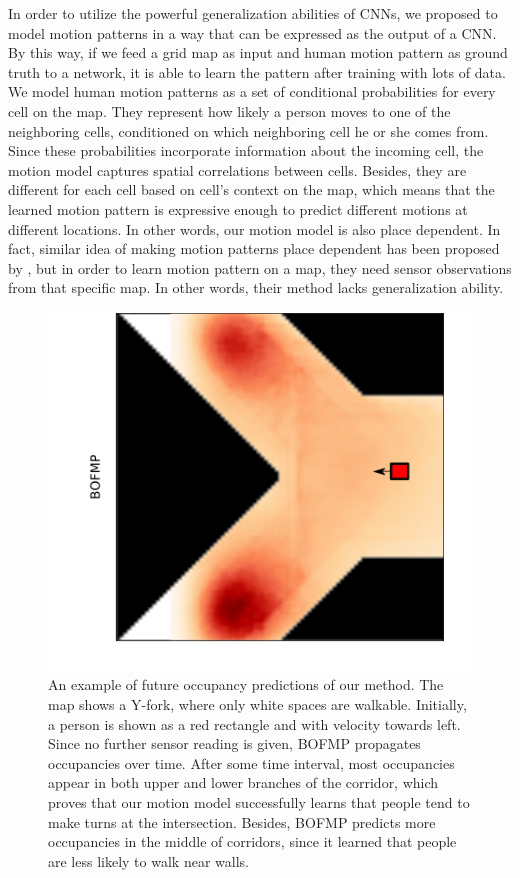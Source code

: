 In order to utilize the powerful generalization abilities of CNNs, we proposed to model motion patterns in a way that can be expressed as the output of a CNN. By this way, if we feed a grid map as input and human motion pattern as ground truth to a network, it is able to learn the pattern after training with lots of data. We model human motion patterns as a set of conditional probabilities for every cell on the map. They represent how likely a person moves to one of the neighboring cells, conditioned on which neighboring cell he or she comes from. Since these probabilities incorporate information about the incoming cell, the motion model captures spatial correlations between cells. Besides, they are different for each cell based on cell's context on the map, which means that the learned motion pattern is expressive enough to predict different motions at different locations. In other words, our motion model is also place dependent. In fact, similar idea of making motion patterns place dependent has been proposed by \cite{kucner2013conditional}, but in order to learn motion pattern on a map, they need sensor observations from that specific map. In other words, their method lacks generalization ability. 

\begin{figure}[H]
  \centering
    \includegraphics[width=.6\textwidth]{figures/theme_plot_1.png}
    \caption[An example of future occupancy predictions of our method.]{An example of future occupancy predictions of our method.  The map shows a Y-fork, where only white spaces are walkable. Initially, a person is shown as a red rectangle and with velocity towards left. Since no further sensor reading is given, BOFMP propagates occupancies over time. After some time interval, most occupancies appear in both upper and lower branches of the corridor, which proves that our motion model successfully learns that people tend to make turns at the intersection. Besides, BOFMP predicts more occupancies in the middle of corridors, since it learned that people are less likely to walk near walls.}
    \label{fig:intro_idea}
\end{figure}

